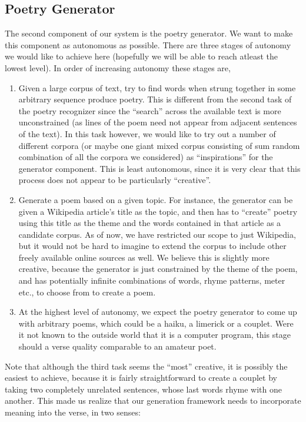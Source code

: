 \documentclass[10pt, letter,twocolumn]{IEEEtran}
\begin{document}
\subsection*{Poetry Generator}
The second component of our system is the poetry generator. We want to make this component as autonomous as possible. There are three stages of autonomy we would like to achieve here (hopefully we will be able to reach atleast the lowest level). In order of increasing autonomy these stages are,
\begin{enumerate}
	\item Given a large corpus of text, try to find words when strung together in some arbitrary sequence produce poetry. This is different from the second task of the poetry recognizer since the ``search'' across the available text is more unconstrained (as lines of the poem need not appear from adjacent sentences of the text). In this task however, we would like to try out a number of different corpora (or maybe one giant mixed corpus consisting of sum random combination of all the corpora we considered) as ``inspirations'' for the generator component. This is least autonomous, since it is very clear that this process does not appear to be particularly ``creative''.
	\item Generate a poem based on a given topic. For instance, the generator can be given a Wikipedia article's title as the topic, and then has to ``create'' poetry using this title as the theme and the words contained in that article as a candidate corpus. As of now, we have restricted our scope to just Wikipedia, but it would not be hard to imagine to extend the corpus to include other freely available online sources as well. We believe this is slightly more creative, because the generator is just constrained by the theme of the poem, and has potentially infinite combinations of words, rhyme patterns, meter etc., to choose from to create a poem.
	\item At the highest level of autonomy, we expect the poetry generator to come up with arbitrary poems, which could be a haiku, a limerick or a couplet. Were it not known to the outside world that it is a computer program, this stage should a verse quality comparable to an amateur poet.
\end{enumerate}
Note that although the third task seems the ``most'' creative, it is possibly the easiest to achieve, because it is fairly straightforward to create a couplet by taking two completely unrelated sentences, whose last words rhyme with one another. This made us realize that our generation framework needs to incorporate meaning into the verse, in two senses:
\end{document}
